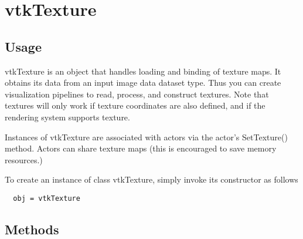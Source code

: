 \section{vtkTexture}

\subsection{Usage}

 vtkTexture is an object that handles loading and binding of texture
 maps. It obtains its data from an input image data dataset type.
 Thus you can create visualization pipelines to read, process, and 
 construct textures. Note that textures will only work if texture
 coordinates are also defined, and if the rendering system supports 
 texture.

 Instances of vtkTexture are associated with actors via the actor's
 SetTexture() method. Actors can share texture maps (this is encouraged
 to save memory resources.) 

To create an instance of class vtkTexture, simply
invoke its constructor as follows
\begin{verbatim}
  obj = vtkTexture
\end{verbatim}
\subsection{Methods}

